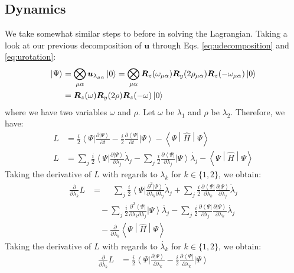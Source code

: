 \documentclass{aux/ttuthes2007}
\newcommand{\bra}[1]{\ensuremath{\left\langle#1\right\vert}}
\newcommand{\ket}[1]{\ensuremath{\left|#1\right\rangle}}
\newcommand{\sandwich}[3]{\left< #1 \middle\vert #2 \middle\vert #3 \right>}
\newcommand{\pd}[1]{\frac{\partial}{\partial #1}}
\newcommand{\kpp}[1]{\frac{\partial \ket\Psi}{\partial #1}}
\newcommand{\bpp}[1]{\frac{\partial \bra\Psi}{\partial #1}}
\newcommand{\kppd}[2]{\frac{\partial^{2} \ket\Psi}{\partial #1 \partial #2}}
\newcommand{\bppd}[2]{\frac{\partial^{2} \bra\Psi}{\partial #1 \partial #2}}
\newcommand{\ind}[1]{{\uo #1 \oo #1}}
\newcommand{\uo}[1]{
		\IfEqCase{#1}{
			{0}{\mu}
			{1}{\nu}
			{2}{\xi}
		}[\PackageError{uo}{Undefined option to uo: #1}{}]
}
\newcommand{\oo}[1]{
		\IfEqCase{#1}{
			{0}{\alpha}
			{1}{\beta}
			{2}{\gamma}
		}[\PackageError{unocorb}{Undefined option to unuo: #1}{}]
}
\begin{document}
\subsection {\textbf{Dynamics}}
%
We take somewhat similar steps to before in solving the Lagrangian. Taking a look at our previous decomposition of $\bm u$ through Eqs. \ref{eq:udecomposition} and \ref{eq:urotation}:
\begin{equation*}
\begin{split}
	\ket\Psi 
	&= \bigotimes_{\ind 0} 
		\bm u_{\lambda_{\ind 0}} \ket 0
	= \bigotimes_{\ind 0} 
		\bm R_z(\omega_{\ind 0}) \bm R_y(2\rho_\ind 0) \bm R_z(-\omega_\ind 0) \ket 0
		\\
	&= \bm R_z(\omega) \bm R_y(2\rho) \bm R_z(-\omega) \ket 0
\end{split}
\end{equation*}
%
where we have two variables $\omega$ and $\rho$. Let $\omega$ be $\lambda_1$ and $\rho$ be $\lambda_2$. Therefore, we have:
%
\begin{equation*}
	\begin{split}
		L &= \frac{i}{2}\bra{\Psi}{\kpp t} - \frac{i}{2}{\bpp{t}}\ket{\Psi} - \sandwich{\Psi}{\hat H}{\Psi} \\
	L &= 	
		\sum_j \frac{i}{2}\bra{\Psi}{\kpp {\lambda_j}} \dot \lambda_j
	- 	\sum_j \frac{i}{2}{\bpp{\lambda_j}}\ket{\Psi}\dot{\lambda_j}
	- \sandwich{\Psi}{\hat H}{\Psi}
	\end{split}
\end{equation*}
%
Taking the derivative of $L$ with regards to $\lambda_k$ for $k \in \{1, 2\}$, we obtain:
%
\begin{equation*}
	\begin{split}
	\pd{\lambda_k} L &= 	
	\phantom{-}\sum_j \frac{i}{2}\bra{\Psi}{\kppd {\lambda_k}{\lambda_j}} \dot \lambda_j
	+	\sum_j \frac{i}{2}\bpp{\lambda_k}{\kpp {\lambda_j}} \dot \lambda_j \\
	&\quad -\sum_j \frac{i}{2}{\bppd{\lambda_k}{\lambda_j}}\ket{\Psi}\dot{\lambda_j}
	- 	\sum_j \frac{i}{2}{\bpp{\lambda_j}}\kpp{\lambda_k}\dot{\lambda_j}\\
	&\quad -\pd{\lambda_k} \sandwich{\Psi}{\hat H}{\Psi}
	\end{split}
\end{equation*}
%
Taking the derivative of $L$ with regards to $\dot{\lambda_k}$ for $k \in \{1, 2\}$, we obtain:
%
\begin{equation*}
	\begin{split}
		\pd{\dot{\lambda_k}} L &=
		\frac{i}{2}\bra{\Psi}{\kpp {\lambda_k}}
	- 	\frac{i}{2}{\bpp{\lambda_k}}\ket{\Psi}
	\end{split}
\end{equation*}
\end{document}
